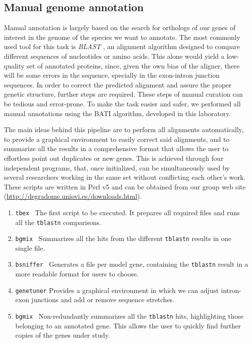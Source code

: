 \subsection{Manual genome annotation} \label{ss_matmet_manual_annotation}

Manual annotation is largely based on the search for orthologs of our genes of interest in the genome of the species we want to annotate.
The most commonly used tool for this task is \emph{BLAST} \cite{Altschul1990}, an alignment algorithm designed to compare different sequences of nucleotides or amino acids.
This alone would yield a low-quality set of annotated proteins, since, given the own bias of the aligner, there will be some errors in the sequence, specially in the exon-intron junction sequences.
In order to correct the predicted alignment and assure the proper genetic structure, further steps are required.
These steps of manual curation can be tedious and error-prone. To make the task easier and safer, we performed all manual annotations using the BATI algorithm, developed in this laboratory.

The main ideas behind this pipeline are to perform all alignments automatically, to provide a graphical environment to easily correct said alignments, and to summarize all the results in a comprehensive format that allows the user to effortless point out duplicates or new genes.
This is achieved through four independent programs, that, once initialized, can be simultaneously used by several researchers working in the same set without conflicting each other's work.
These scripts are written in Perl v5 and can be obtained from our group web site (\href{http://degradome.uniovi.es/downloads.html}{http://degradome.uniovi.es/downloads.html}).

\begin{enumerate}[topsep=1ex,itemsep=-1ex]
	\item{\texttt{tbex     }} The first script to be executed. It prepares all required files and runs all the \texttt{tblastn} comparisons.
	\item{\texttt{bgmix    }} Summarizes all the hits from the different \texttt{tblastn} results in one single file.
	\item{\texttt{bsniffer }} Generates a file per model gene, containing the \texttt{tblastn} result in a more readable format for users to choose.
	\item{\texttt{genetuner}} Provides a graphical environment in which we can adjust intron-exon junctions and add or remove sequence stretches.
	\item{\texttt{bgmix    }} Non-redundantly summarizes all the \texttt{tblastn} hits, highlighting those belonging to an annotated gene. This allows the user to quickly find further copies of the genes under study.
\end{enumerate}

